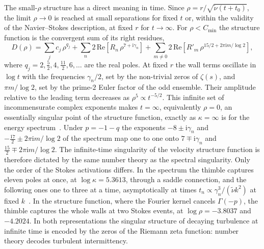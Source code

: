 \documentclass[aip,pof,preprint,floatfix,nofootinbib,amsmath,amssymb]{revtex4-2}
\def\I{\mathrm{i}}
\begin{document}
The small-$\rho$ structure has a direct meaning in time. Since $\rho=r/\sqrt{\tilde\nu(t+t_0)}$, the limit $\rho\to0$ is
reached at small separations for fixed $t$ or, within the validity of the Navier--Stokes description, at fixed $r$ for
$t\to\infty$. For $\rho<C_{\min}$ the structure function is the convergent sum of its right residues,
\begin{equation}
    D(\rho)=\sum_j c_j\,\rho^{q_j}+\sum_{n}2\,\mathrm{Re}\left[R_n\,\rho^{7+\I\gamma_n}\right]
    +\sum_{m\ne0}2\,\mathrm{Re}\left[R'_m\,\rho^{15/2+2\pi\I m/\log2}\right],
    \label{eq:smallrho}
\end{equation}
where $q_j=2,\tfrac52,4,\tfrac{11}{2},6,\ldots$ are the real poles. At fixed $r$ the wall terms oscillate in $\log t$ with the
frequencies $\gamma_n/2$, set by the non-trivial zeros of $\zeta(s)$, and $\pi m/\log2$, set by the prime-$2$ Euler factor of the
odd ensemble. Their amplitude relative to the leading term decreases as $\rho^{5}\propto t^{-5/2}$. This infinite set of
incommensurate complex exponents makes $t=\infty$, equivalently $\rho=0$, an essentially singular point of the structure
function, exactly as $\kappa=\infty$ is for the energy spectrum~\cite{migdal2026Riemann}. Under $p=-1-q$ the exponents
$-8\pm\I\gamma_n$ and $-\tfrac{17}{2}\pm2\pi\I m/\log2$ of the spectrum map one to one onto $7\mp\I\gamma_n$ and
$\tfrac{15}{2}\mp2\pi\I m/\log2$. The infinite-time singularity of the velocity structure function is therefore dictated by the
same number theory as the spectral singularity. Only the order of the Stokes activations differs. In the spectrum the thimble
captures eleven poles at once, at $\log\kappa=5.3613$, through a saddle connection, and the following ones one to three at a
time, asymptotically at times $t_n\propto\gamma_n^3/(\tilde\nu k^2)$ at fixed $k$~\cite{migdal2026Riemann}. In the
structure function, where the Fourier kernel cancels $\Gamma(-p)$, the thimble captures the whole walls at two Stokes events,
at $\log\rho=-3.8037$ and $-4.2024$. In both representations the singular structure of decaying turbulence at
infinite time is encoded by the zeros of the Riemann zeta function: number theory decodes turbulent intermittency.
\end{document}
